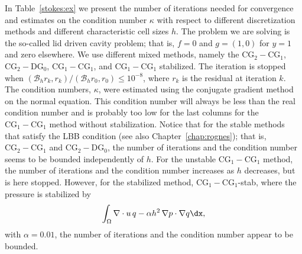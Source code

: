 In Table~\ref{stokes:ex} we present the number of iterations needed
for convergence and estimates on the condition number $\kappa$ with
respect to different discretization methods and different
characteristic cell sizes $h$. The problem we are solving is the
so-called lid driven cavity problem; that is, $f=0$ and $g = (1,0)$ for
$y=1$ and zero elsewhere.  We use different mixed methods, namely the
$\mathrm{CG}_2-\mathrm{CG}_1$, $\mathrm{CG}_2-\mathrm{DG}_0$,
$\mathrm{CG}_1-\mathrm{CG}_1$, and $\mathrm{CG}_1-\mathrm{CG}_1$
stabilized.  The iteration is stopped when $(\mathcal{B}_h r_k,
r_k)/(\mathcal{B}_h r_0, r_0) \le 10^{-8}$, where $r_k$ is the
residual at iteration $k$.  The condition numbers, $\kappa$, were
estimated using the conjugate gradient method on the normal
equation. This condition number will always be less than the real
condition number and is probably too low for the last columns for the
$\mathrm{CG}_1-\mathrm{CG}_1$ method without stabilization.
Notice that for the stable methods that satisfy the
LBB condition (see also Chapter~\ref{chap:rognes}); that is,
 $\mathrm{CG}_2-\mathrm{CG}_1$
and $\mathrm{CG}_2-\mathrm{DG}_0$, the number of iterations and the
condition number seems to be bounded independently of $h$. For the
unstable $\mathrm{CG}_1-\mathrm{CG}_1$ method, the number of
iterations and the condition number increases as $h$
decreases, but is here stopped. However, for the stabilized method,
$\mathrm{CG}_1-\mathrm{CG}_1$-stab, where the pressure is stabilized
by
\[
\int_\Omega \nabla \cdot u \, q  - \alpha h^2 \, \nabla p \cdot \nabla q
    \dx,
\]
with $\alpha=0.01$, the number of iterations and the condition number appear to be bounded.

